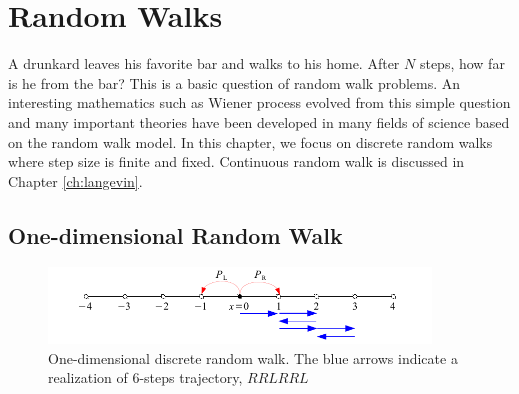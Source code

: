 \chapter{Random Walks}\label{ch:random-walk}

A drunkard leaves his favorite bar and walks to his home. After $N$ steps, how far is he from the bar?  This is a basic question of random walk problems.  An interesting mathematics such as Wiener process evolved from this simple question and many important theories have been developed in many fields of science based on the random walk model.  In this chapter, we focus on discrete random walks where step size is finite and fixed.  Continuous random walk is discussed in Chapter \ref{ch:langevin}.

\section{One-dimensional Random Walk}

\begin{figure}
	\centering
	\includegraphics[width=4in]{16.Random-Walk/1d_random_walk.pdf}
	\caption{One-dimensional discrete random walk. The blue arrows indicate a realization of 6-steps trajectory, $RRLRRL$}
	\label{fig:1d_random_walk}
\end{figure}

